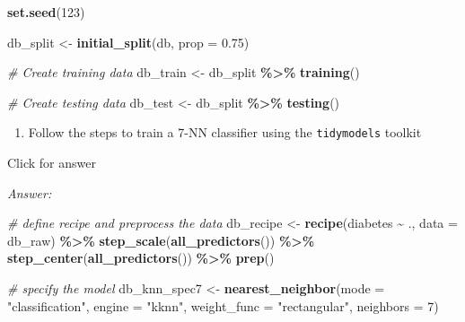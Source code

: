 \documentclass[
]{book}
\newenvironment{Shaded}{\begin{snugshade}}{\end{snugshade}}
\newcommand{\AttributeTok}[1]{\textcolor[rgb]{0.13,0.29,0.53}{#1}}
\newcommand{\CommentTok}[1]{\textcolor[rgb]{0.56,0.35,0.01}{\textit{#1}}}
\newcommand{\DecValTok}[1]{\textcolor[rgb]{0.00,0.00,0.81}{#1}}
\newcommand{\FloatTok}[1]{\textcolor[rgb]{0.00,0.00,0.81}{#1}}
\newcommand{\FunctionTok}[1]{\textcolor[rgb]{0.13,0.29,0.53}{\textbf{#1}}}
\newcommand{\NormalTok}[1]{#1}
\newcommand{\OtherTok}[1]{\textcolor[rgb]{0.56,0.35,0.01}{#1}}
\newcommand{\SpecialCharTok}[1]{\textcolor[rgb]{0.81,0.36,0.00}{\textbf{#1}}}
\newcommand{\StringTok}[1]{\textcolor[rgb]{0.31,0.60,0.02}{#1}}
\providecommand{\tightlist}{%
  \setlength{\itemsep}{0pt}\setlength{\parskip}{0pt}}
\begin{document}
\begin{Shaded}
\begin{Highlighting}[]
\FunctionTok{set.seed}\NormalTok{(}\DecValTok{123}\NormalTok{)}

\NormalTok{db\_split }\OtherTok{\textless{}{-}} \FunctionTok{initial\_split}\NormalTok{(db, }\AttributeTok{prop =} \FloatTok{0.75}\NormalTok{)}

\CommentTok{\# Create training data}
\NormalTok{db\_train }\OtherTok{\textless{}{-}}\NormalTok{ db\_split }\SpecialCharTok{\%\textgreater{}\%} \FunctionTok{training}\NormalTok{()}

\CommentTok{\# Create testing data}
\NormalTok{db\_test }\OtherTok{\textless{}{-}}\NormalTok{ db\_split }\SpecialCharTok{\%\textgreater{}\%}  \FunctionTok{testing}\NormalTok{()}
\end{Highlighting}
\end{Shaded}

\begin{enumerate}
\def\labelenumi{\alph{enumi}.}
\setcounter{enumi}{1}
\tightlist
\item
  Follow the steps to train a 7-NN classifier using the \texttt{tidymodels} toolkit
\end{enumerate}

Click for answer

\emph{Answer:}

\begin{Shaded}
\begin{Highlighting}[]
\CommentTok{\# define recipe and preprocess the data}
\NormalTok{db\_recipe }\OtherTok{\textless{}{-}} \FunctionTok{recipe}\NormalTok{(diabetes }\SpecialCharTok{\textasciitilde{}}\NormalTok{ ., }\AttributeTok{data =}\NormalTok{ db\_raw) }\SpecialCharTok{\%\textgreater{}\%}
  \FunctionTok{step\_scale}\NormalTok{(}\FunctionTok{all\_predictors}\NormalTok{()) }\SpecialCharTok{\%\textgreater{}\%}
  \FunctionTok{step\_center}\NormalTok{(}\FunctionTok{all\_predictors}\NormalTok{()) }\SpecialCharTok{\%\textgreater{}\%}
  \FunctionTok{prep}\NormalTok{()}
\end{Highlighting}
\end{Shaded}

\begin{Shaded}
\begin{Highlighting}[]
\CommentTok{\# specify the model}
\NormalTok{db\_knn\_spec7 }\OtherTok{\textless{}{-}} \FunctionTok{nearest\_neighbor}\NormalTok{(}\AttributeTok{mode =} \StringTok{"classification"}\NormalTok{,}
                             \AttributeTok{engine =} \StringTok{"kknn"}\NormalTok{,}
                             \AttributeTok{weight\_func =} \StringTok{"rectangular"}\NormalTok{,}
                             \AttributeTok{neighbors =} \DecValTok{7}\NormalTok{)}
\end{Highlighting}
\end{Shaded}
\end{document}
